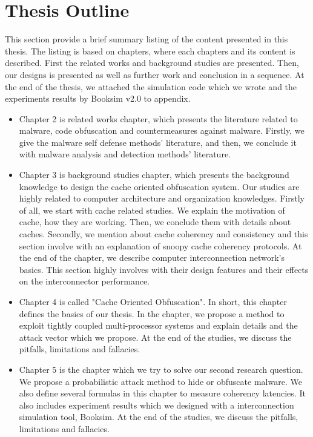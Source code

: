 \section{Thesis Outline}
	This section provide a brief summary listing of the content presented in this thesis. The listing is based on chapters, where each chapters and its content is described. First the related works and background studies are presented. Then, our designs is presented as well as further work and conclusion in a sequence. At the end of the thesis, we attached the simulation code which we wrote and the experiments results by Booksim v2.0 to appendix.
	
\begin{itemize}
	\item Chapter 2 is related works chapter, which presents the literature related to malware, code obfuscation and countermeasures against malware. Firstly, we give the malware self defense methods' literature, and then, we conclude it with malware analysis and detection methods' literature.
	\item Chapter 3 is background studies chapter, which presents the background knowledge to design the cache oriented obfuscation system. Our studies are highly related to computer architecture and organization knowledges. Firstly of all, we start with cache related studies. We explain the motivation of cache, how they are working. Then, we conclude them with details about caches. Secondly, we mention about cache coherency and consistency and this section involve with an explanation of snoopy cache coherency protocols. At the end of the chapter, we describe computer interconnection network's basics. This section highly involves with their design features and their effects on the interconnector performance.
	\item Chapter 4 is called "Cache Oriented Obfuscation". In short, this chapter defines the basics of our thesis. In the chapter, we propose a method to exploit tightly coupled multi-processor systems and explain details and the attack vector which we propose. At the end of the studies, we discuss the pitfalls, limitations and fallacies.
	\item Chapter 5 is the chapter which we try to solve our second research question. We propose a probabilistic attack method to hide or obfuscate malware. We also define several formulas in this chapter to measure coherency latencies. It also includes experiment results which we designed with a interconnection simulation tool, Booksim. At the end of the studies, we discuss the pitfalls, limitations and fallacies.

\end{itemize}
